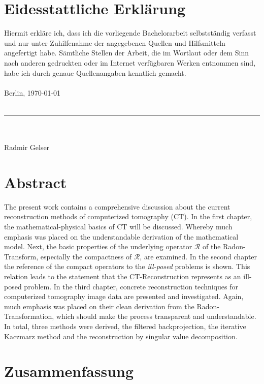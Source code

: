 \section*{Eidesstattliche Erklärung} 
\thispagestyle{empty}

Hiermit erkläre ich, dass ich die vorliegende Bachelorarbeit selbstständig verfasst und nur unter
Zuhilfenahme der angegebenen Quellen und Hilfsmitteln angefertigt habe. Sämtliche Stellen der Arbeit, die im Wortlaut oder dem Sinn nach anderen gedruckten oder im Internet verfügbaren Werken entnommen sind, habe ich durch genaue Quellenangaben
kenntlich gemacht.\\
\vspace{20pt}\\
Berlin, \today\\
\vspace{15pt}\\
\par\noindent\rule{0.25\textwidth}{0.4pt}\\\\
Radmir Gelser


\newpage
\section*{Abstract} 	%

The present work contains a comprehensive discussion about the current reconstruction methods of computerized tomography (CT). In the first chapter, the mathematical-physical basics of CT will be discussed. Whereby much emphasis was placed on the understandable derivation of the mathematical model. Next, the basic properties of the underlying operator $\mathcal{R}$ of the Radon-Transform, especially the compactness of $\mathcal{R}$, are examined. In the second chapter the reference of the compact operators to the \textit{ill-posed} problems is shown. This relation leads to the statement that the CT-Reconstruction represents as an ill-posed problem. In the third chapter, concrete reconstruction techniques for computerized tomography image data are presented and investigated. Again, much emphasis was placed on their clean derivation from the Radon-Transformation, which should make the process transparent and understandable. In total, three methods were derived, the filtered backprojection, the iterative Kaczmarz method and the reconstruction by singular value decomposition.

\section*{Zusammenfassung}


